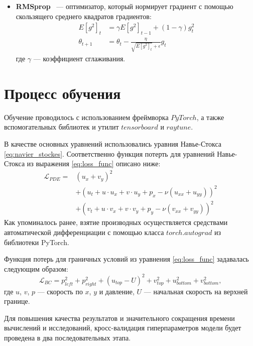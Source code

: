 \begin{itemize}
    \item \textbf{RMSprop}~\cite{tieleman2012lecture} --- оптимизатор, который нормирует градиент с помощью скользящего среднего квадратов градиентов:
    \[
    \begin{aligned}
        E[g^2]_t &= \gamma E[g^2]_{t-1} + (1 - \gamma) g_t^2 \\
        \theta_{t+1} &= \theta_t - \frac{\eta}{\sqrt{E[g^2]_t} + \epsilon} g_t
    \end{aligned}
    \]
    где $\gamma$ --- коэффициент сглаживания.
\end{itemize}

\section{Процесс обучения}
Обучение проводилось с использованием фреймворка $PyTorch$, а также вспомогательных
библиотек и утилит $tensorboard$ и $ray tune$.

В качестве основных уравнений использовались уравния Навье-Стокса \eqref{eq:navier_stockes}.
Соответственно функция потерть для уравнений Навье-Стокса из выражения \eqref{eq:loss_func}
описано ниже:
\begin{equation}
    \begin{split}
        \mathcal{L}_{PDE} = & (u_x + v_y)^2 \\
        & + (u_t + u \cdot u_x + v \cdot u_y + p_x - \nu (u_{xx} + u_{yy}))^2 \\
        & + (v_t + u \cdot v_x + v \cdot v_y + p_y - \nu (v_{xx} + v_{yy}))^2
    \end{split}
\end{equation}
Как упоминалось ранее, взятие производных осуществляется средствами автоматической
дифференциации с помощью класса $torch.autograd$ из библиотеки PyTorch.

Функция потерь для граничных условий из уравнения \eqref{eq:loss_func} задавалась
следующим образом:
\begin{equation}
    \mathcal{L}_{BC} = p_{left}^2 + p_{right}^2 + (u_{top} - U)^2 + v_{top}^2 + u_{bottom}^2 + v_{bottom}^2,
\end{equation}
где $u$, $v$, $p$ --- скорость по $x$, $y$ и давление, $U$ --- начальная скорость на 
верхней границе.

Для повышения качества результатов и значительного сокращения времени вычислений и
исследований, кросс-валидация гиперпараметров модели будет проведена в два
последовательных этапа.

